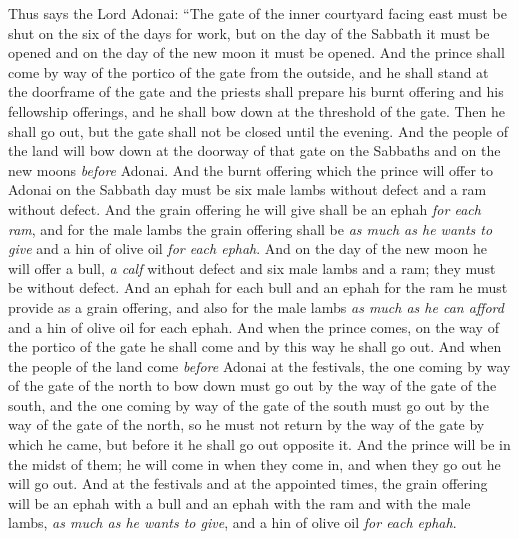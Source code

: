 \begin{biblechapter} %
\verse Thus says the Lord Adonai: “The gate of the inner courtyard facing east must be shut on the six of the days for work, but on the day of the Sabbath it must be opened and on the day of the new moon it must be opened.
\verse And the prince shall come by way of the portico of the gate from the outside, and he shall stand at the doorframe of the gate and the priests shall prepare his burnt offering and his fellowship offerings, and he shall bow down at the threshold of the gate. Then he shall go out, but the gate shall not be closed until the evening.
\verse And the people of the land will bow down at the doorway of that gate on the Sabbaths and on the new moons \textit{before} Adonai.
\verse And the burnt offering which the prince will offer to Adonai on the Sabbath day must be six male lambs without defect and a ram without defect.
\verse And the grain offering he will give shall be an ephah \textit{for each ram}, and for the male lambs the grain offering shall be \textit{as much as he wants to give} and a hin of olive oil \textit{for each ephah}.
\verse And on the day of the new moon he will offer a bull, \textit{a calf} without defect and six male lambs and a ram; they must be without defect.
\verse And an ephah for each bull and an ephah for the ram he must provide as a grain offering, and also for the male lambs \textit{as much as he can afford} and a hin of olive oil for each ephah.
\verse And when the prince comes, on the way of the portico of the gate he shall come and by this way he shall go out.
\verse And when the people of the land come \textit{before} Adonai at the festivals, the one coming by way of the gate of the north to bow down must go out by the way of the gate of the south, and the one coming by way of the gate of the south must go out by the way of the gate of the north, so he must not return by the way of the gate by which he came, but before it he shall go out opposite it.
\verse And the prince will be in the midst of them; he will come in when they come in, and when they go out he will go out.
\verse And at the festivals and at the appointed times, the grain offering will be an ephah with a bull and an ephah with the ram and with the male lambs, \textit{as much as he wants to give}, and a hin of olive oil \textit{for each ephah}.

\end{biblechapter}
